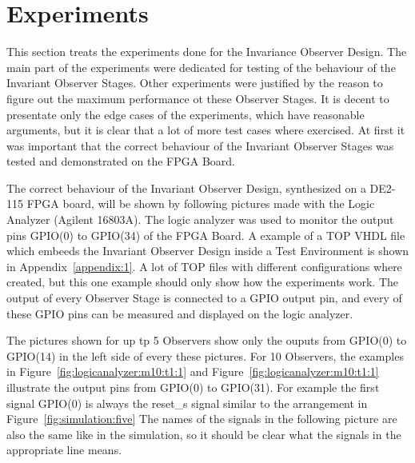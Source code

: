 \newpage
\section{Experiments}
\label{chapter:4:section:3}
This section treats the experiments done for the Invariance Observer Design. The main part of the experiments were dedicated for testing of the behaviour of the
Invariant Observer Stages. Other experiments were justified by the reason to figure out the maximum performance ot these Observer Stages. 
It is decent to presentate only the edge cases of the experiments, which have reasonable arguments, but it is clear that a lot of more test cases where exercised. 
At first it was important that the correct behaviour of the Invariant Observer Stages was tested and demonstrated on the FPGA Board. 
 
The correct behaviour of the Invariant Observer Design, synthesized on a DE2-115 FPGA board, will be shown by following pictures made with the Logic Analyzer (Agilent 16803A). 
The logic analyzer was used to monitor the output pins GPIO(0) to GPIO(34) of the FPGA Board. 
A example of a TOP VHDL file which embeeds the Invariant Observer Design inside a Test Environment is shown 
in Appendix~\ref{appendix:1}. %
A lot of TOP files with different configurations where created, but this one example should only show how the experiments work. 
The output of every Observer Stage is connected to a GPIO output pin, and every of these GPIO pins can be measured and displayed on the logic analyzer. 

The pictures shown for up tp 5 Observers show only the ouputs from GPIO(0) to GPIO(14) in the left side of every these pictures. 
For 10 Observers, the examples in Figure~\ref{fig:logicanalyzer:m10:t1:1} and Figure~\ref{fig:logicanalyzer:m10:t1:1} illustrate the output pins from GPIO(0) to GPIO(31). 
For example the first signal GPIO(0) is always the reset\_s signal similar to the arrangement in Figure~\ref{fig:simulation:five} 
The names of the signals in the following picture are also the same like in the simulation, so it should be clear what the signals in the appropriate line means. 

